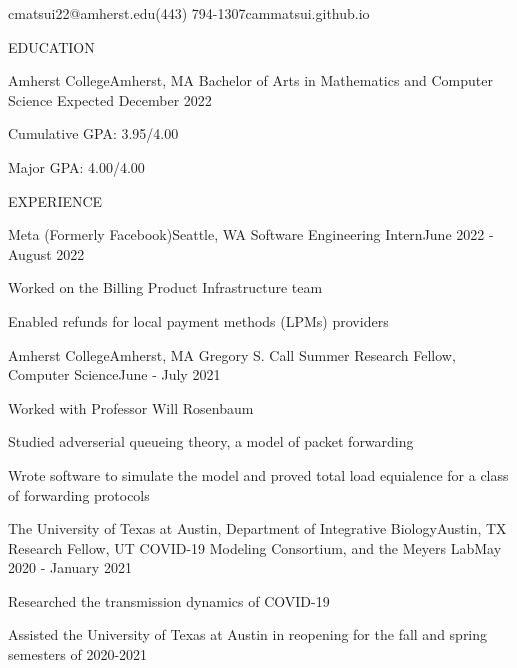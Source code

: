 \documentclass{article}
\begin{document}
\thispagestyle{empty}

        {cmatsui22@amherst.edu}{(443) 794-1307}{cammatsui.github.io}

\begin{bigsection}{EDUCATION}
    \begin{sectionitem}{Amherst College}{Amherst, MA}
            {Bachelor of Arts in Mathematics and Computer Science}
            {Expected December 2022}
        \item Cumulative GPA: 3.95/4.00
        \item Major GPA: 4.00/4.00
    \end{sectionitem}
\end{bigsection}

\begin{bigsection}{EXPERIENCE}
    \begin{sectionitem}{Meta (Formerly Facebook)}{Seattle, WA}
            {Software Engineering Intern}{June 2022 - August 2022}
        \item Worked on the Billing Product Infrastructure team
        \item Enabled refunds for local payment methods (LPMs) providers
    \end{sectionitem}

    \begin{sectionitem}{Amherst College}{Amherst, MA}
            {Gregory S. Call Summer Research Fellow, Computer Science}{June - July 2021}
        \item Worked with Professor Will Rosenbaum
        \item Studied adverserial queueing theory, a model of packet forwarding
        \item Wrote software to simulate the model and proved total load equialence for a class of forwarding protocols
    \end{sectionitem}

    \begin{sectionitem}{The University of Texas at Austin, Department of Integrative Biology}{Austin, TX}
            {Research Fellow, UT COVID-19 Modeling Consortium, and the Meyers Lab}{May 2020 - January 2021}
        \item Researched the transmission dynamics of COVID-19
        \item Assisted the University of Texas at Austin in reopening for the fall and spring semesters of 2020-2021
    \end{sectionitem}
\end{bigsection}
\end{document}

